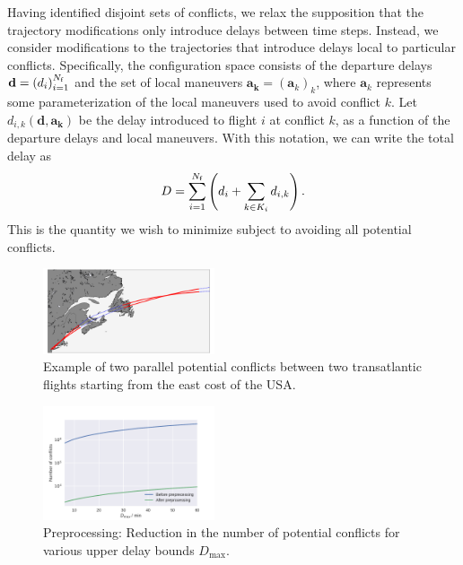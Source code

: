 Having identified disjoint sets of conflicts, we relax the supposition that the trajectory modifications only introduce delays between time steps.
Instead, we consider modifications to the trajectories that introduce delays local to particular conflicts.
Specifically, the configuration space consists of the departure delays $\mathbf d = {\left(d_i\right)}_{i=1}^{N_{\mathrm{f}}}$ and the set of local maneuvers $\mathbf a_{\mathbf k} = {\left(\mathbf a_k\right)}_k$, where $\mathbf a_k$ represents some parameterization of the local maneuvers used to avoid conflict $k$.
Let $d_{i, k} (\mathbf d, \mathbf a_{\mathbf k})$ be the delay introduced to flight $i$ at conflict $k$, as a function of the departure delays and local maneuvers.
With this notation, we can write the total delay as
\begin{equation}
D = 
\sum_{i = 1}^{N_{\mathrm{f}}}
\left(d_i + \sum_{k \in K_i} d_{i, k}\right).
\end{equation}
This is the quantity we wish to minimize subject to avoiding all potential conflicts.
\begin{figure}[h]
    \begin{center}
        \includegraphics[width=0.45\textwidth]{./pics/example_conflict_in_real_space.pdf}
    \end{center}
    \caption[Conflict example]{Example of two parallel potential conflicts between two transatlantic flights starting from the east cost of the USA.}
\label{fig:example_parallel_conflict}
\end{figure}

\begin{figure}[h]
    \begin{center}
        \includegraphics[width=0.45\textwidth]{./pics/preprocessing_reduction_number_of_conflicts.pdf}
    \end{center}
    \caption[Conflict preproccesing]{Preprocessing: Reduction in the number of potential conflicts for various upper delay bounds $D_\text{max}$.}
\label{fig:preprocessing_reduction_number_of_conflicts}
\end{figure}


